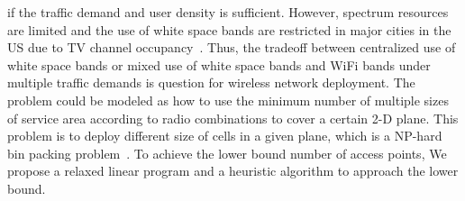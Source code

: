 if the traffic demand and user density is sufficient. 
However, spectrum resources are limited and the use of white space bands are restricted in major 
cities in the US due to TV channel occupancy~\cite{msdatabase}. 
Thus, the tradeoff between centralized use of white space bands or mixed use of white space
bands and WiFi bands under multiple traffic demands is question for wireless network deployment. 
The problem could be modeled as how to use the minimum number of multiple sizes of service area according to 
radio combinations to cover a certain 2-D plane. This problem is to deploy different size of cells in 
a given plane, which is a NP-hard bin packing problem~\cite{martello1998exact}. 
To achieve the lower bound number of access points, We propose a relaxed linear program and a 
heuristic algorithm to approach the lower bound.




